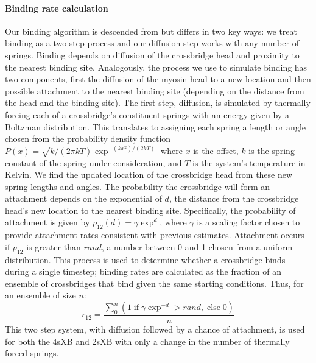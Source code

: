 \documentclass[]{article}
\begin{document}
\paragraph{Binding rate calculation} %
Our binding algorithm is descended from \citet{Tanner2007} but differs in two key ways: we treat binding as a two step process and our diffusion step works with any number of springs.
Binding depends on diffusion of the crossbridge head and proximity to the nearest binding site.
Analogously, the process we use to simulate binding has two components, first the diffusion of the myosin head to a new location and then possible attachment to the nearest binding site (depending on the distance from the head and the binding site).
The first step, diffusion, is simulated by thermally forcing each of a crossbridge's constituent springs with an energy given by a Boltzman distribution.
This translates to assigning each spring a length or angle chosen from the probability density function $P(x) = \sqrt{k / (2 \pi kT)} \exp^{-(k x^2)/(2 kT)}$ where $x$ is the offset, $k$ is the spring constant of the spring under consideration, and $T$ is the system's temperature in Kelvin.
We find the updated location of the crossbridge head from these new spring lengths and angles.
The probability the crossbridge will form an attachment depends on the exponential of $d$, the distance from the crossbridge head's new location to the nearest binding site.
Specifically, the probability of attachment is given by $p_{12}(d) = \gamma \exp ^{d}$, where $\gamma$ is a scaling factor chosen to provide attachment rates consistent with previous estimates.
Attachment occurs if $p_{12}$ is greater than $rand$, a number between 0 and 1 chosen from a uniform distribution.
This process is used to determine whether a crossbridge binds during a single timestep; binding rates are calculated as the fraction of an ensemble of crossbridges that bind given the same starting conditions. 
Thus, for an ensemble of size $n$: 
$$r_{12} =  \frac{\sum_0^n \left( 1\; \textrm{if}\; \gamma \exp^{-d}>rand ,\; \textrm{else}\; 0 \right)}{n}$$
This two step system, with diffusion followed by a chance of attachment, is used for both the 4sXB and 2sXB with only a change in the number of thermally forced springs.
\end{document}
